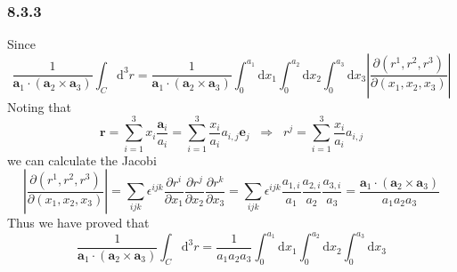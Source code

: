 \documentclass[]{ctexart}
\begin{document}
\subsubsection*{8.3.3}
Since 
\begin{equation*}
\frac{1}{\mathbf a_1\cdot(\mathbf a_2\times\mathbf a_3)}\int_C\mathrm{d}^3r=\frac{1}{\mathbf a_1\cdot(\mathbf a_2\times\mathbf a_3)}\int_{0}^{a_1}\mathrm{d}x_1\int_0^{a_2}\mathrm{d}x_2\int_0^{a_3}\mathrm{d}x_3\left|\frac{\partial(r^1,r^2,r^3)}{\partial(x_1,x_2,x_3)}\right|
\end{equation*}
Noting that 
\begin{equation*}
\mathbf r=\sum_{i=1}^3x_i\frac{\mathbf a_i}{a_i}=\sum_{i=1}^3\frac{x_i}{a_i}a_{i,j}\mathbf e_j\;\;\Rightarrow\;\;r^j=\sum_{i=1}^{3}\frac{x_i}{a_i}a_{i,j}
\end{equation*}
we can calculate the Jacobi 
\begin{equation*}
\left|\frac{\partial(r^1,r^2,r^3)}{\partial(x_1,x_2,x_3)}\right|=\sum_{ijk}\epsilon^{ijk}\frac{\partial r^i}{\partial x_1}\frac{\partial r^j}{\partial x_2}\frac{\partial r^k}{\partial x_3}=\sum_{ijk}\epsilon^{ijk}\frac{a_{1,i}}{a_1}\frac{a_{2,i}}{a_2}\frac{a_{3,i}}{a_3}=\frac{\mathbf a_1\cdot(\mathbf a_2\times\mathbf a_3)}{a_1a_2a_3}
\end{equation*}
Thus we have proved that 
\begin{equation*}
\frac{1}{\mathbf a_1\cdot(\mathbf a_2\times\mathbf a_3)}\int_C\mathrm{d}^3r=\frac{1}{a_1a_2a_3}\int_0^{a_1}\mathrm{d}x_1\int_0^{a_2}\mathrm{d}x_2\int_0^{a_3}\mathrm{d}x_3
\end{equation*}
\end{document}
